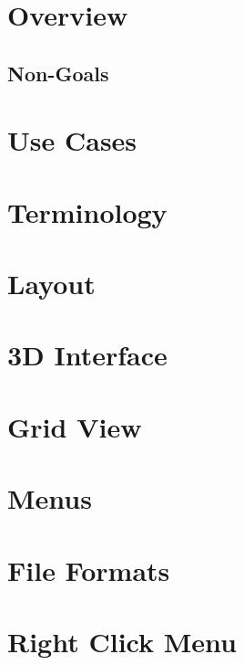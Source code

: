 \documentclass[12pt]{article}
\begin{document}
\maketitle
\tableofcontents

\section{Overview}

\subsection{Non-Goals}

\section{Use Cases}



\section{Terminology}

\section{Layout}

\section{3D Interface}

\section{Grid View}

\section{Menus}

\section{File Formats}

\section{Right Click Menu}
\end{document}
